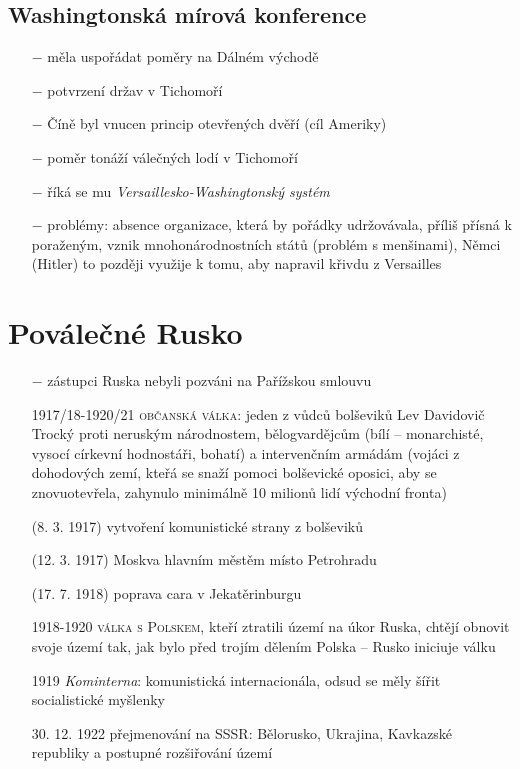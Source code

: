 \documentclass{article}
\begin{document}
\subsection*{Washingtonská mírová konference}
\begin{itemize}
    \vspace{-0.5em}
    \setlength\itemsep{0.15em}
    \item[$-$] měla uspořádat poměry na Dálném východě
    \item[$-$] potvrzení držav v Tichomoří
    \item[$-$] Číně byl vnucen princip otevřených dvěří (cíl Ameriky)
    \item[$-$] poměr tonáží válečných lodí v Tichomoří
    \item[$-$] říká se mu \textit{Versaillesko-Washingtonský systém}
    \item[$-$] problémy: absence organizace, která by pořádky udržovávala, příliš přísná k poraženým, vznik mnohonárodnostních států (problém s menšinami), Němci (Hitler) to později využije k tomu, aby napravil křivdu z Versailles
\end{itemize}

\section*{Poválečné Rusko}

\begin{itemize}
    \vspace{-0.5em}
    \setlength\itemsep{0.15em}
    \item[$-$] zástupci Ruska nebyli pozváni na Pařížskou smlouvu
    \item[1917/18-1920/21] \textsc{občanská válka}: jeden z vůdců bolševiků Lev Davidovič Trocký proti neruským národnostem, bělogvardějcům (bílí -- monarchisté, vysocí církevní hodnostáři, bohatí) a intervenčním armádám (vojáci z dohodových zemí, kteřá se snaží pomoci bolševické oposici, aby se znovuotevřela, zahynulo minimálně 10 milionů lidí východní fronta)
    \item[(8. 3. 1917)] vytvoření komunistické strany z bolševiků
    \item[(12. 3. 1917)] Moskva hlavním městěm místo Petrohradu
    \item[(17. 7. 1918)] poprava cara v Jekatěrinburgu
    \item[1918-1920] \textsc{válka s Polskem}, kteří ztratili území na úkor Ruska, chtějí obnovit svoje území tak, jak bylo před trojím dělením Polska -- Rusko iniciuje válku
    \item[1919] \textit{Kominterna}: komunistická internacionála, odsud se měly šířit socialistické myšlenky
    \item[30. 12. 1922] přejmenování na SSSR: Bělorusko, Ukrajina, Kavkazské republiky a postupné rozšiřování území
\end{itemize}
\end{document}
